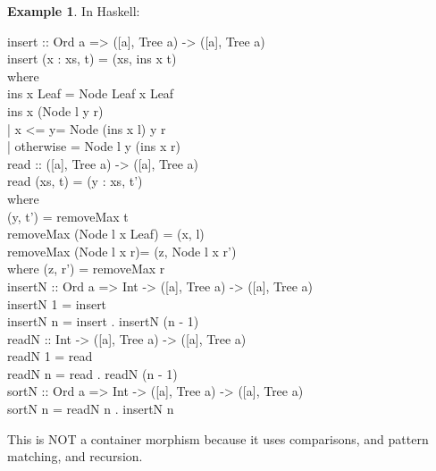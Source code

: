 \documentclass[11pt, a4paper]{article}
\theoremstyle{definition}
\newtheorem{example}[definition]{Example}
\theoremstyle{plain}
\begin{document}
\begin{example}
In Haskell:
\begin{center}
\colorbox{gray!15}{\begin{minipage}{0.85\linewidth}
\ttfamily
insert :: Ord a => ([a], Tree a) -> ([a], Tree a)\\
insert (x : xs, t) = (xs, ins x t)\\
\hspace*{1.5em}where\\
\hspace*{3em}ins x Leaf = Node Leaf x Leaf\\
\hspace*{3em}ins x (Node l y r)\\
\hspace*{4.5em}| x <= y\hspace*{1.4em}= Node (ins x l) y r\\
\hspace*{4.5em}| otherwise = Node l y (ins x r)\\[6pt]
read :: ([a], Tree a) -> ([a], Tree a)\\
read (xs, t) = (y : xs, t')\\
\hspace*{1.5em}where\\
\hspace*{3em}(y, t') = removeMax t\\
\hspace*{3em}removeMax (Node l x Leaf) = (x, l)\\
\hspace*{3em}removeMax (Node l x r)\hspace*{1.1em}= (z, Node l x r')\\
\hspace*{4.5em}where (z, r') = removeMax r\\[6pt]
insertN :: Ord a => Int -> ([a], Tree a) -> ([a], Tree a)\\
insertN 1 = insert\\
insertN n = insert . insertN (n - 1)\\[6pt]
readN :: Int -> ([a], Tree a) -> ([a], Tree a)\\
readN 1 = read\\
readN n = read . readN (n - 1)\\[6pt]
sortN :: Ord a => Int -> ([a], Tree a) -> ([a], Tree a)\\
sortN n = readN n . insertN n
\end{minipage}}
\end{center}
This is NOT a container
morphism because it uses comparisons, and pattern matching, and
recursion.
\end{example}
\end{document}
